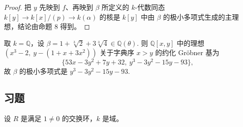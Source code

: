 \begin{proof}
把 \(y\) 先映到 \(f\)、再映到 \(\beta\) 所定义的 \(k\)-代数同态 \(k[y] \to k[x]/(p) \to k(\alpha)\) 的核是 \(k[y]\) 中由 \(\beta\) 的极小多项式生成的主理想，结论由命题 8 得到。
\end{proof}

\begin{example}
取 \(k = \mathbb{Q}\)，设 \(\beta = 1+\sqrt[3]{2}+3\sqrt[3]{4} \in \mathbb{Q}(\theta)\). 则 \(\mathbb{Q}[x,y]\) 中的理想 \((x^3-2,\ y-(1+x+3x^2))\) 关于字典序 \(x > y\) 的约化 Gröbner 基为
\[
\{53x-3y^2+7y+32,\ y^3-3y^2-15y-93\},
\]
故 \(\beta\) 的极小多项式是 \(y^3-3y^2-15y-93\).
\end{example}

\subsection*{习题}

设 \(R\) 是满足 \(1 \neq 0\) 的交换环，\(k\) 是域。

